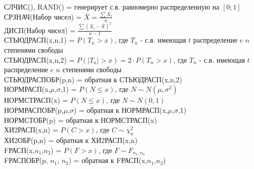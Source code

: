 
СЛЧИС(), RAND() = генерирует с.в. равномерно распределенную на
$[0;1]$ \\
СРЗНАЧ(Набор чисел) = $\bar{X}=\frac{\sum X_{i}}{n}$ \\
ДИСП(Набор чисел) = $\frac{\sum (X_{i}-\bar{X})^{2}}{n-1}$ \\
СТЬЮДРАСП(x,n,1) = $P(T_{n}>x)$, где $T_{n}$ - с.в. имеющая $t$
распределение c $n$ степенями свободы \\
СТЬЮДРАСП(x,n,2) = $P(|T_{n}|>x)=2\cdot P(T_{n}>x)$, где $T_{n}$ -
с.в. имеющая $t$ распределение c $n$ степенями свободы \\
СТЬЮДРАСПОБР(p,n) = обратная к СТЬЮДРАСП(x,n,2) \\
НОРМРАСП(x,$\mu$,$\sigma$,1) = $P(N\le x)$, где $N\sim
N(\mu,\sigma^{2})$ \\
НОРМСТРАСП(x) = $P(N\le x)$, где $N\sim
N(0,1)$ \\
НОРМРАСПОБР(p,$\mu$,$\sigma$) = обратная к
НОРМРАСП(x,$\mu$,$\sigma$,1) \\
НОРМСТОБР(p) = обратная к НОРМСТРАСП(x) \\
ХИ2РАСП(x,n) = $P(C>x)$, где $C\sim \chi_{n}^{2}$ \\
ХИ2ОБР(p,n) = обратная к ХИ2РАСП(x,n) \\
FРАСП(x,$n_{1}$,$n_{2}$) = $P(F>x)$, где $F\sim F_{n_{1},n_{2}}$ \\
FРАСПОБР(p, $n_{1}$, $n_{2}$) = обратная к
FРАСП(x,$n_{1}$,$n_{2}$) \\
